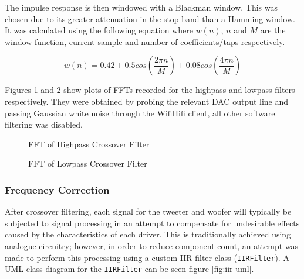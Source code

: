 \documentclass[main.tex]{subfiles}
\begin{document}
\medskip
The impulse response is then windowed with a Blackman window.
This was chosen due to its greater attenuation in the stop band than a Hamming window\cite{DSP-berndporr}.
It was calculated using the following equation where $w(n)$, $n$ and $M$ are the window function, current sample and number of coefficients/taps respectively.

\begin{equation}
    w(n)=
    0.42 + 0.5cos\left(\frac{2\pi n}{M}\right) + 0.08cos\left(\frac{4\pi n}{M}\right)
\end{equation}

Figures \ref{fig:tweeter-fft} and \ref{fig:woofer-fft} show plots of FFTs recorded for the highpass and lowpass filters respectively.
They were obtained by probing the relevant DAC output line and passing Gaussian white noise through the WifiHifi client, all other software filtering was disabled.

\begin{figure}[H]
    \centering
    \caption{FFT of Highpass Crossover Filter}
    \label{fig:tweeter-fft}
\end{figure}

\begin{figure}[H]
    \centering
    \caption{FFT of Lowpass Crossover Filter}
    \label{fig:woofer-fft}
\end{figure}

\subsubsection{Frequency Correction}
After crossover filtering, each signal for the tweeter and woofer will typically be subjected to signal processing in an attempt to compensate for undesirable effects caused by the characteristics of each driver.
This is traditionally achieved using analogue circuitry; however, in order to reduce component count, an attempt was made to perform this processing using a custom IIR filter class (\lstinline{IIRFilter}).
A UML class diagram for the \lstinline{IIRFilter} can be seen figure \ref{fig:iir-uml}.
\end{document}
